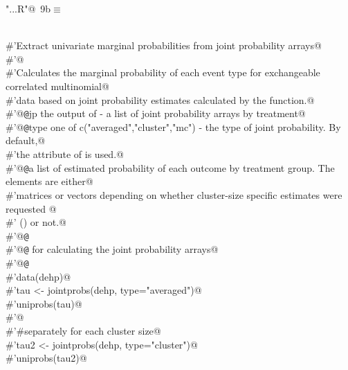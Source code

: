 \documentclass[reqno]{amsart}
\renewcommand{\NWtarget}[2]{\hypertarget{#1}{#2}}
\begin{document}
\begin{flushleft} \small\label{scrap40}\raggedright\small
\NWtarget{nuweb9b}{} \verb@"..\R\ExchMultinomial.R"@\nobreak\ {\footnotesize {9b}}$\equiv$
\vspace{-1ex}
\begin{list}{}{} \item
\mbox{}\verb@@\\
\mbox{}\verb@#'Extract univariate marginal probabilities from joint probability arrays@\\
\mbox{}\verb@#'@\\
\mbox{}\verb@#'Calculates the marginal probability of each event type for exchangeable correlated multinomial@\\
\mbox{}\verb@#'data based on joint probability estimates calculated by the  function.@\\
\mbox{}\verb@#'@{\tt @}\verb@param jp the output of  - a list of joint probability arrays by treatment@\\
\mbox{}\verb@#'@{\tt @}\verb@param type one of c("averaged","cluster","mc") - the type of joint probability. By default,@\\
\mbox{}\verb@#'the  attribute of  is used.@\\
\mbox{}\verb@#'@{\tt @}\verb@return a list of estimated probability of each outcome by treatment group. The elements are either@\\
\mbox{}\verb@#'matrices or vectors depending on whether cluster-size specific estimates were requested @\\
\mbox{}\verb@#' () or not.@\\
\mbox{}\verb@#'@{\tt @}\verb@export@\\
\mbox{}\verb@#'@{\tt @}\verb@seealso {} for calculating the joint probability arrays@\\
\mbox{}\verb@#'@{\tt @}\verb@examples@\\
\mbox{}\verb@#'data(dehp)@\\
\mbox{}\verb@#'tau <- jointprobs(dehp, type="averaged")@\\
\mbox{}\verb@#'uniprobs(tau)@\\
\mbox{}\verb@#'@\\
\mbox{}\verb@#'#separately for each cluster size@\\
\mbox{}\verb@#'tau2 <- jointprobs(dehp, type="cluster")@\\
\mbox{}\verb@#'uniprobs(tau2)@\\

\end{list}
\end{flushleft}
\end{document}
